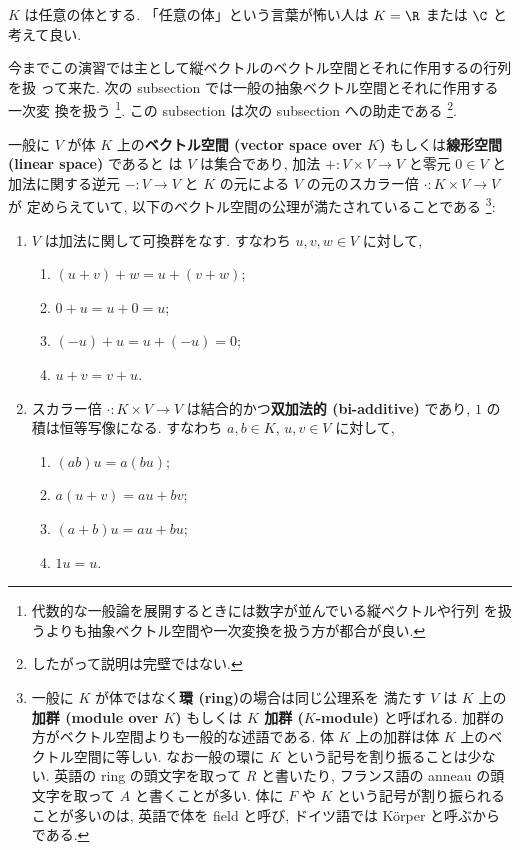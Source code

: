 \documentclass[12pt,twoside]{jarticle}
\begin{document}
$K$ は任意の体とする.  「任意の体」という言葉が怖い人は $K=\R$ または $\C$ 
と考えて良い.

今までこの演習では主として縦ベクトルのベクトル空間とそれに作用するの行列を扱
って来た.  次の subsection では一般の抽象ベクトル空間とそれに作用する一次変
換を扱う%
\footnote{代数的な一般論を展開するときには数字が並んでいる縦ベクトルや行列
を扱うよりも抽象ベクトル空間や一次変換を扱う方が都合が良い.}.  
この subsection は次の subsection への助走である%
\footnote{したがって説明は完壁ではない.}.

\medskip

一般に $V$ が体 $K$ 上の{\bf ベクトル空間 (vector space over $K$)} 
もしくは{\bf 線形空間 (linear space)} であると
は $V$ は集合であり, 
加法 $+:V\times V\to V$ 
と零元 $0\in V$ 
と加法に関する逆元 $-:V\to V$ 
と $K$ の元による $V$ の元のスカラー倍 $\cdot:K\times V\to V$ が
定めらえていて, 以下のベクトル空間の公理が満たされていることである%
\footnote{一般に $K$ が体ではなく{\bf 環 (ring)}の場合は同じ公理系を
  満たす $V$ は $K$ 上の{\bf 加群 (module over $K$)} 
  もしくは {\bf $K$ 加群 ($K$-module)} と呼ばれる.  
  加群の方がベクトル空間よりも一般的な述語である.  
  体 $K$ 上の加群は体 $K$ 上のベクトル空間に等しい.  
  なお一般の環に $K$ という記号を割り振ることは少ない.
  英語の ring の頭文字を取って $R$ と書いたり, 
  フランス語の anneau の頭文字を取って $A$ と書くことが多い.
  体に $F$ や $K$ という記号が割り振られることが多いのは,
  英語で体を field と呼び, ドイツ語では K\"orper と呼ぶからである.}:
\begin{enumerate}
\item $V$ は加法に関して可換群をなす. すなわち $u,v,w\in V$ に対して,
  \begin{enumerate}
  \item $(u + v) + w = u + (v + w)$;
  \item $0 + u = u + 0 = u$;
  \item $(-u) + u = u + (-u) = 0$;
  \item $u + v = v + u$.
  \end{enumerate}
\item スカラー倍 $\cdot:K\times V\to V$ は結合的かつ{\bf 双加法的 
  (bi-additive)} であり, $1$ の積は恒等写像になる.
  すなわち $a,b\in K$, $u,v\in V$ に対して,
  \begin{enumerate}
  \item $(ab)u = a(bu)$;
  \item $a(u + v) = au + bv$;
  \item $(a + b)u = au + bu$;
  \item $1u=u$.
  \end{enumerate}
\end{enumerate}
\end{document}
